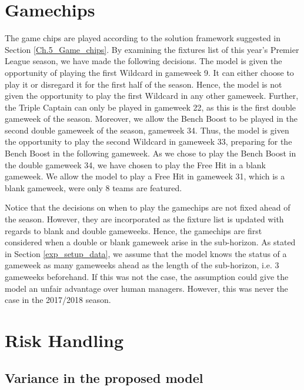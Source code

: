 \section{Gamechips} \label{exp_setup_gamechips}

The game chips are played according to the solution framework suggested in Section \ref{Ch.5_Game_chips}. By examining the fixtures list of this year's Premier League season, we have made the following decisions. The model is given the opportunity of playing the first Wildcard in gameweek 9. It can either choose to play it or disregard it for the first half of the season. Hence, the model is not given the opportunity to play the first Wildcard in any other gameweek. Further, the Triple Captain can only be played in gameweek 22, as this is the first double gameweek of the season. Moreover, we allow the Bench Boost to be played in the second double gameweek of the season, gameweek 34. Thus, the model is given the opportunity to play the second Wildcard in gameweek 33, preparing for the Bench Boost in the following gameweek. As we chose to play the Bench Boost in the double gameweek 34, we have chosen to play the Free Hit in a blank gameweek. We allow the model to play a Free Hit in gameweek 31, which is a blank gameweek, were only 8 teams are featured. 

\newpar

Notice that the decisions on when to play the gamechips are not fixed ahead of the season. However, they are incorporated as the fixture list is updated with regards to blank and double gameweeks. Hence, the gamechips are first considered when a double or blank gameweek arise in the sub-horizon. As stated in Section \ref{exp_setup_data}, we assume that the model knows the status of a gameweek as many gameweeks ahead as the length of the sub-horizon, i.e. 3 gameweeks beforehand. If this was not the case, the assumption could give the model an unfair advantage over human managers. However, this was never the case in the 2017/2018 season.


 
\section{Risk Handling} \label{exp_setup_Value_Variance}

\subsection{Variance in the proposed model}

